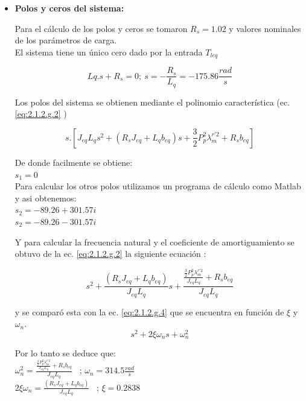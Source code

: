 \documentclass[10pt]{article}
\begin{document}
\begin{itemize} 
\item \textbf{Polos y ceros del sistema:}

Para el cálculo de los polos y ceros se tomaron $R_{s}=1.02$ y valores nominales de los parámetros de carga.\\
El sistema tiene un único cero dado por la entrada $T_{leq}$

	\begin{equation}
	Lq . s + R_{s}=0; \ s=-\frac{R_{s}}{L_{q}} = -175.86 \frac{rad}{s}
	\label{eq:2.1.2.g.1}
	\end{equation}
	
Los polos del sistema se obtienen mediante el polinomio característica (ec. \ref{eq:2.1.2.g.2} )

	\begin{equation}
	s.[J_{eq}L_{q}s^{2}+(R_{s}J_{eq}+L_{q}b_{eq})s + \frac{3}{2}P_{p}^{2}\lambda ^{r'2}_{m}+R_{s}b_{eq}]
	\label{eq:2.1.2.g.2}
	\end{equation}
	
De donde facilmente se obtiene:\\
$s_{1}=0$\\

Para calcular los otros polos utilizamos un programa de cálculo como Matlab y asi obtenemos:\\
$s_{2}=-89.26 + 301.57 i$\\
$s_{2}=-89.26 - 301.57 i$

Y para calcular la frecuencia natural y el coeficiente de amortiguamiento se obtuvo de la ec. \ref{eq:2.1.2.g.2} la siguiente ecuación :

	\begin{equation}
	s^{2}+\frac{(R_{s}J_{eq}+L_{q}b_{eq})}{J_{eq}L_{q}}s +\frac{\frac{ \frac{3}{2}P_{p}^{2}\lambda ^{r'2}_{m}}{J_{eq}L_{q}}+R_{s}b_{eq}}{J_{eq}L_{q}}
	\label{eq:2.1.2.g.3}
	\end{equation}
	
y se comparó esta con la ec. \ref{eq:2.1.2.g.4} que se encuentra en función de $\xi$ y $\omega_{n}$.
	\begin{equation}
	s^{2}+2\xi \omega_{n} s + \omega_{n}^2 
	\label{eq:2.1.2.g.4}
	\end{equation}

Por lo tanto se deduce que:\\
$\omega_{n}^2 =\frac{\frac{ \frac{3}{2}P_{p}^{2}\lambda ^{r'2}_{m}}{J_{eq}L_{q}}+R_{s}b_{eq}}{J_{eq}L_{q}}$ \ ; $\omega_{n}=314.5 \frac{rad}{s}$\\
$2\xi \omega_{n}=\frac{(R_{s}J_{eq}+L_{q}b_{eq})}{J_{eq}L_{q}}$ \ ; $\xi=0.2838$


\end{itemize}
\end{document}
